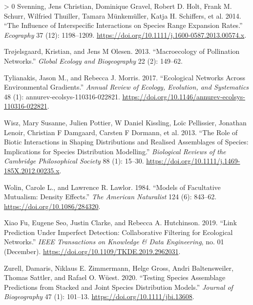 \documentclass[12pt]{article}
\newlength{\cslhangindent}
\newenvironment{CSLReferences}[3] %
 {%
  \setlength{\parindent}{0pt}
  \ifodd #1 \everypar{\setlength{\hangindent}{\cslhangindent}}\ignorespaces\fi
  \ifnum #2 > 0
  \setlength{\parskip}{#2\baselineskip}
  \fi
 }%
 {}
\begin{document}
\begin{CSLReferences}{1}{0}
\leavevmode\hypertarget{ref-Svenning2014InfInt}{}%
Svenning, Jens Christian, Dominique Gravel, Robert D. Holt, Frank M.
Schurr, Wilfried Thuiller, Tamara Münkemüller, Katja H. Schiffers, et
al. 2014. {``The Influence of Interspecific Interactions on Species
Range Expansion Rates.''} \emph{Ecography} 37 (12): 1198--1209.
\url{https://doi.org/10.1111/j.1600-0587.2013.00574.x}.

\leavevmode\hypertarget{ref-Trojelsgaard2013MacPol}{}%
Trøjelsgaard, Kristian, and Jens M Olesen. 2013. {``Macroecology of
Pollination Networks.''} \emph{Global Ecology and Biogeography} 22 (2):
149--62.

\leavevmode\hypertarget{ref-Tylianakis2017EcoNet}{}%
Tylianakis, Jason M., and Rebecca J. Morris. 2017. {``Ecological
Networks Across Environmental Gradients.''} \emph{Annual Review of
Ecology, Evolution, and Systematics} 48 (1):
annurev-ecolsys-110316-022821.
\url{https://doi.org/10.1146/annurev-ecolsys-110316-022821}.

\leavevmode\hypertarget{ref-Wisz2013RolBio}{}%
Wisz, Mary Susanne, Julien Pottier, W Daniel Kissling, Loïc Pellissier,
Jonathan Lenoir, Christian F Damgaard, Carsten F Dormann, et al. 2013.
{``The Role of Biotic Interactions in Shaping Distributions and Realised
Assemblages of Species: Implications for Species Distribution
Modelling.''} \emph{Biological Reviews of the Cambridge Philosophical
Society} 88 (1): 15--30.
\url{https://doi.org/10.1111/j.1469-185X.2012.00235.x}.

\leavevmode\hypertarget{ref-Wolin1984ModFac}{}%
Wolin, Carole L., and Lawrence R. Lawlor. 1984. {``Models of Facultative
Mutualism: Density Effects.''} \emph{The American Naturalist} 124 (6):
843--62. \url{https://doi.org/10.1086/284320}.

\leavevmode\hypertarget{ref-XiaoFu2019LinPre}{}%
Xiao Fu, Eugene Seo, Justin Clarke, and Rebecca A. Hutchinson. 2019.
{``Link Prediction Under Imperfect Detection: Collaborative Filtering
for Ecological Networks.''} \emph{IEEE Transactions on Knowledge \& Data
Engineering}, no. 01 (December).
\url{https://doi.org/10.1109/TKDE.2019.2962031}.

\leavevmode\hypertarget{ref-Zurell2020TesSpe}{}%
Zurell, Damaris, Niklaus E. Zimmermann, Helge Gross, Andri
Baltensweiler, Thomas Sattler, and Rafael O. Wüest. 2020. {``Testing
Species Assemblage Predictions from Stacked and Joint Species
Distribution Models.''} \emph{Journal of Biogeography} 47 (1): 101--13.
\url{https://doi.org/10.1111/jbi.13608}.

\end{CSLReferences}
\end{document}
